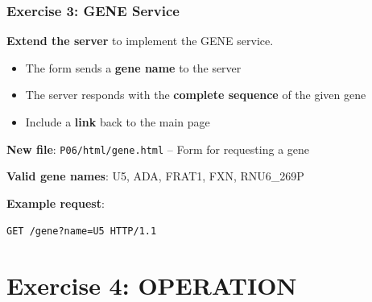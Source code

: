 \documentclass[xcolor=table]{beamer}
\begin{document}
\begin{frame}
\frametitle{Exercise 3: GENE Service}

\textbf{Extend the server} to implement the GENE service.

\vspace{0.2cm}

\begin{itemize}
\item The form sends a \textbf{gene name} to the server
\item The server responds with the \textbf{complete sequence} of the given gene
\item Include a \textbf{link} back to the main page
\end{itemize}

\vspace{0.3cm}

\textbf{New file}: \texttt{P06/html/gene.html} -- Form for requesting a gene

\vspace{0.3cm}

\textbf{Valid gene names}: U5, ADA, FRAT1, FXN, RNU6\_269P

\vspace{0.3cm}

\textbf{Example request}:

\vspace{0.1cm}

\begin{center}
\texttt{GET /gene?name=U5 HTTP/1.1}
\end{center}

\end{frame}


\section{Exercise 4: OPERATION}
\end{document}
